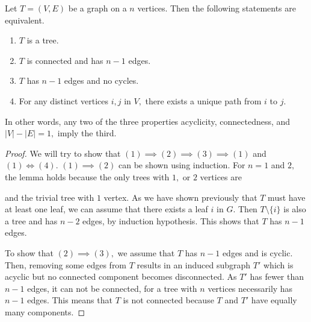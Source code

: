 \begin{theorem}
	Let $T = (V, E)$ be a graph on a $n$ vertices. Then the 
	following statements are equivalent. 
\begin{enumerate}
	\item $T$ is a tree.
	\item $T$ is connected and has $n-1$ edges.
	\item $T$ has $n-1$ edges and no cycles.
	\item For any distinct vertices $i, j$ in $V,$ there exists
		a unique path from $i$ to $j.$
\end{enumerate}
\end{theorem}
In other words, any two of the three properties acyclicity, 
connectedness, and $\lvert V \rvert - \lvert E \rvert = 1,$
imply the third.
\begin{proof}
	We will try to show that $(1) \implies (2) \implies (3) \implies
	(1)$ and $(1) \iff (4).$ 
	$(1) \implies (2)$ can be shown using induction. For $n=1$ and 
	$2,$ the lemma holds because the only trees with $1,$ or $2$
	vertices are
\begin{figure}[h]
\centering
{}
\end{figure}
and the trivial tree with $1$ vertex.
As we have shown previously that $T$ must have at least one leaf, 
we can assume that there exists a leaf $i$ in $G.$ Then $T \setminus
\{i\}$ is also a tree and has $n-2$ edges, by induction hypothesis.
This shows that $T$ has $n-1$ edges.

To show that $(2) \implies (3),$ we assume that $T$ has $n-1$ edges
and is cyclic. Then, removing some edges from $T$ results in an
induced subgraph $T'$ which is acyclic but no connected component
becomes disconnected. As $T'$ has fewer than $n-1$
edges, it can not be connected, for a tree with $n$ vertices
necessarily has $n-1$ edges. This means that $T$ is not connected
because $T$ and $T'$ have equally many components.

\end{proof}
